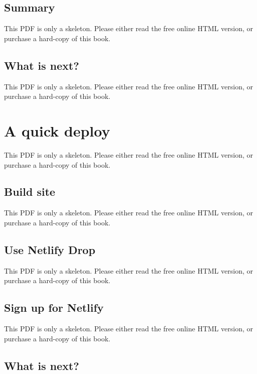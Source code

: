 \documentclass[
  12pt,
]{krantz}
\begin{document}
\subsection{Summary}\label{summary}

This PDF is only a skeleton. Please either read the free online HTML version, or purchase a hard-copy of this book.

\subsection{What is next?}\label{what-is-next}

This PDF is only a skeleton. Please either read the free online HTML version, or purchase a hard-copy of this book.

\section{A quick deploy}\label{a-quick-deploy}

This PDF is only a skeleton. Please either read the free online HTML version, or purchase a hard-copy of this book.

\subsection{Build site}\label{build-site}

This PDF is only a skeleton. Please either read the free online HTML version, or purchase a hard-copy of this book.

\subsection{Use Netlify Drop}\label{use-netlify-drop}

This PDF is only a skeleton. Please either read the free online HTML version, or purchase a hard-copy of this book.

\subsection{Sign up for Netlify}\label{sign-up-for-netlify}

This PDF is only a skeleton. Please either read the free online HTML version, or purchase a hard-copy of this book.

\subsection{What is next?}\label{what-is-next-1}
\end{document}
